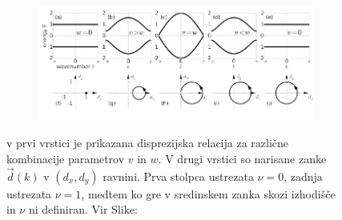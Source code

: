 \begin{figure}[H]
\centering
\begin{subfigure}{.9\textwidth}
\includegraphics[width=\linewidth]{Figures/GapAndTopology.pdf}
\end{subfigure}
\caption{v prvi vrstici je prikazana disprezijska relacija za različne kombinacije parametrov $v$ in $w$. V drugi vrstici so narisane zanke $\vec{d}(k)$ v $(d_x , d_y)$ ravnini. Prva stolpca ustrezata $\nu = 0$, zadnja ustrezata $\nu = 1$, medtem ko gre v sredinskem zanka skozi izhodišče in $\nu$ ni definiran. Vir Slike: \cite{madzar}}
\label{fig:examples}
\end{figure}


